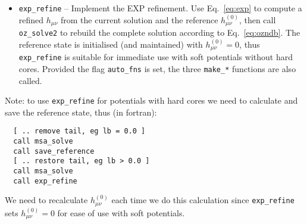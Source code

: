 \documentclass[12pt,a4paper]{article}
\newcommand{\href}{h^{(0)}}
\newcommand{\Eqref}[1]{Eq.~\eqref{#1}}
\newcommand{\FORTRAN}{{\sc fortran}}
\begin{document}
\begin{itemize}
  requires a reference state $\href_{\mu\nu}$, and this routine saves
  the current $h_{\mu\nu}$ as said reference state.  Usually, this
  reference state will be the MSA solution to hard sphere problem
  without the tail potential, however this is not enforced. 
  See below for a note on the usage.
%
\item\verb+exp_refine+ -- Implement the EXP refinement.  Use
  \Eqref{eq:exp} to compute a refined $h_{\mu\nu}$ from the current
  solution and the reference $\href_{\mu\nu}$, then call
  \verb+oz_solve2+ to rebuild the complete solution according to
  \Eqref{eq:ozndb}.  The reference state is initialised (and
  maintained) with $\href_{\mu\nu}=0$, thus \verb+exp_refine+ is
  suitable for immediate use with soft potentials without hard cores.
  Provided the flag \verb+auto_fns+ is set, the three \verb+make_*+
  functions are also called.
\end{itemize}
  
\noindent Note: to use \verb+exp_refine+ for potentials with hard
cores we need to calculate and save the reference state, thus (in
\FORTRAN):
%
\begin{verbatim}
  [ .. remove tail, eg lb = 0.0 ]
  call msa_solve
  call save_reference
  [ .. restore tail, eg lb > 0.0 ]
  call msa_solve
  call exp_refine
\end{verbatim}
%
We need to recalculate $\href_{\mu\nu}$ each time we do this
calculation since \verb+exp_refine+ sets $\href_{\mu\nu}=0$ for ease
of use with soft potentials.
\end{document}
